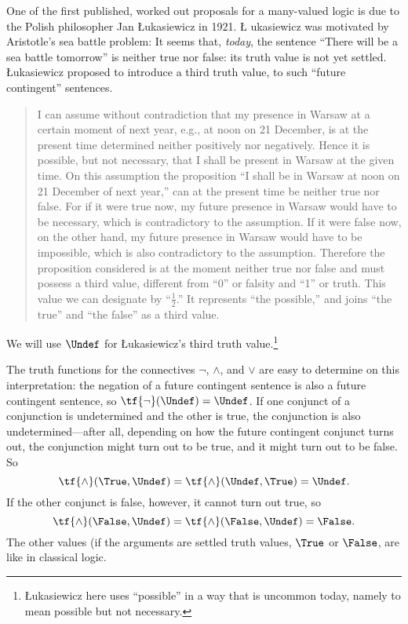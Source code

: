 \documentclass[../../../include/open-logic-section]{subfiles}
\begin{document}

One of the first published, worked out proposals for a many-valued
logic is due to the Polish philosopher Jan \L ukasiewicz in 1921.  \L
ukasiewicz was motivated by Aristotle's sea battle problem: It seems
that, \emph{today}, the sentence ``There will be a sea battle
tomorrow'' is neither true nor false: its truth value is not yet
settled.  \L ukasiewicz proposed to introduce a third truth value,
to such ``future contingent'' sentences.
\begin{quote}
I can assume without contradiction that my presence in Warsaw at a
certain moment of next year, e.g., at noon on 21 December, is at the
present time determined neither positively nor negatively. Hence it is
possible, but not necessary, that I shall be present in Warsaw at the
given time. On this assumption the proposition ``I shall be in Warsaw
at noon on 21 December of next year,'' can at the present time be
neither true nor false. For if it were true now, my future presence in
Warsaw would have to be necessary, which is contradictory to the
assumption. If it were false now, on the other hand, my future
presence in Warsaw would have to be impossible, which is also
contradictory to the assumption. Therefore the proposition considered
is at the moment neither true nor false and must possess a third
value, different from ``0'' or falsity and ``1'' or truth. This value
we can designate by ``$\frac{1}{2}$.'' It represents ``the possible,''
and joins ``the true'' and ``the false'' as a third value.
\end{quote}
We will use $\Undef$ for \L ukasiewicz's third truth
value.\footnote{\L ukasiewicz here uses ``possible'' in a way that is
uncommon today, namely to mean possible but not necessary.}

The truth functions for the connectives $\lnot$, $\land$, and $\lor$
are easy to determine on this interpretation: the negation of a future
contingent sentence is also a future contingent sentence, so
$\tf{\lnot}(\Undef) = \Undef$.  If one conjunct of a
conjunction is undetermined and the other is true, the conjunction is
also undetermined---after all, depending on how the future contingent
conjunct turns out, the conjunction might turn out to be true, and it
might turn out to be false. So \[
    \tf{\land}(\True, \Undef) =
\tf{\land}(\Undef, \True) =
\Undef.
\]
If the other conjunct is false, however, it cannot
turn out true, so \[\tf{\land}(\False, \Undef) =
\tf{\land}(\False, \Undef) = \False.\]
The other values (if the arguments are settled truth values, $\True$
or $\False$, are like in classical logic.
\end{document}
